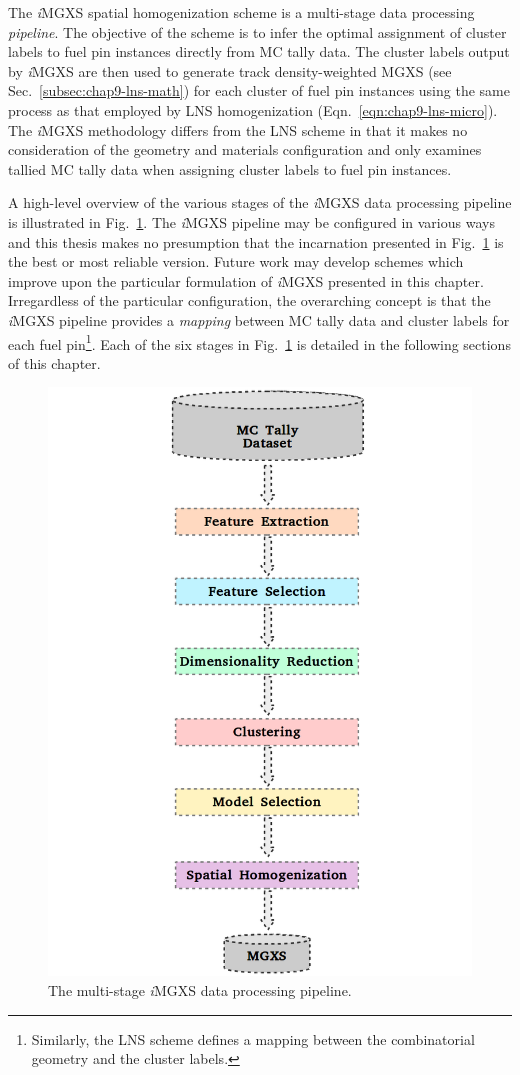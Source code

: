 The \textit{i}\ac{MGXS} spatial homogenization scheme is a multi-stage data processing \textit{pipeline}. The objective of the scheme is to infer the optimal assignment of cluster labels to fuel pin instances directly from \ac{MC} tally data. The cluster labels output by \textit{i}\ac{MGXS} are then used to generate track density-weighted \ac{MGXS} (see Sec.~\ref{subsec:chap9-lns-math}) for each cluster of fuel pin instances using the same process as that employed by \ac{LNS} homogenization (Eqn.~\ref{eqn:chap9-lns-micro}). The \textit{i}\ac{MGXS} methodology differs from the \ac{LNS} scheme in that it makes no consideration of the geometry and materials configuration and only examines tallied \ac{MC} tally data when assigning cluster labels to fuel pin instances.

A high-level overview of the various stages of the \textit{i}\ac{MGXS} data processing pipeline is illustrated in Fig.~\ref{fig:chap10-pipeline}. The \textit{i}\ac{MGXS} pipeline may be configured in various ways and this thesis makes no presumption that the incarnation presented in Fig.~\ref{fig:chap10-pipeline} is the best or most reliable version. Future work may develop schemes which improve upon the particular formulation of \textit{i}\ac{MGXS} presented in this chapter. Irregardless of the particular configuration, the overarching concept is that the \textit{i}\ac{MGXS} pipeline provides a \textit{mapping} between \ac{MC} tally data and cluster labels for each fuel pin\footnote{Similarly, the \ac{LNS} scheme defines a mapping between the combinatorial geometry and the cluster labels.}. Each of the six stages in Fig.~\ref{fig:chap10-pipeline} is detailed in the following sections of this chapter.

\begin{figure}[h!]
\centering
\includegraphics[width=0.655\linewidth]{figures/unsupervised/pipeline}
\vspace{2mm}
\caption[The \textit{i}MGXS data processing pipeline]{The multi-stage \textit{i}\ac{MGXS} data processing pipeline.}
\label{fig:chap10-pipeline}
\end{figure}



